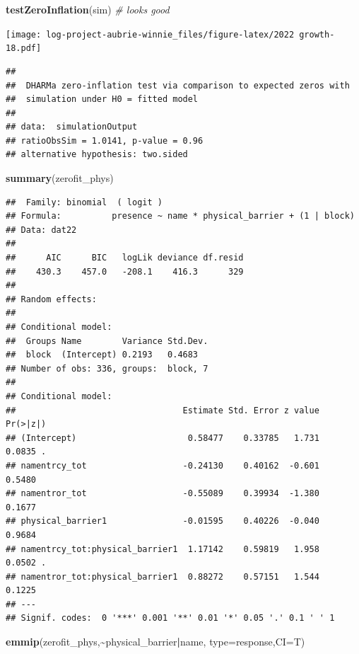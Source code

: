 \documentclass[
]{article}
\newenvironment{Shaded}{\begin{snugshade}}{\end{snugshade}}
\newcommand{\AttributeTok}[1]{\textcolor[rgb]{0.13,0.29,0.53}{#1}}
\newcommand{\CommentTok}[1]{\textcolor[rgb]{0.56,0.35,0.01}{\textit{#1}}}
\newcommand{\FunctionTok}[1]{\textcolor[rgb]{0.13,0.29,0.53}{\textbf{#1}}}
\newcommand{\NormalTok}[1]{#1}
\newcommand{\SpecialCharTok}[1]{\textcolor[rgb]{0.81,0.36,0.00}{\textbf{#1}}}
\newcommand{\StringTok}[1]{\textcolor[rgb]{0.31,0.60,0.02}{#1}}
\begin{document}
\begin{Shaded}
\begin{Highlighting}[]
\FunctionTok{testZeroInflation}\NormalTok{(sim) }\CommentTok{\# looks good}
\end{Highlighting}
\end{Shaded}

\texttt{[image: log-project-aubrie-winnie\_files/figure-latex/2022 growth-18.pdf]}

\begin{verbatim}
## 
##  DHARMa zero-inflation test via comparison to expected zeros with
##  simulation under H0 = fitted model
## 
## data:  simulationOutput
## ratioObsSim = 1.0141, p-value = 0.96
## alternative hypothesis: two.sided
\end{verbatim}

\begin{Shaded}
\begin{Highlighting}[]
\FunctionTok{summary}\NormalTok{(zerofit\_phys)}
\end{Highlighting}
\end{Shaded}

\begin{verbatim}
##  Family: binomial  ( logit )
## Formula:          presence ~ name * physical_barrier + (1 | block)
## Data: dat22
## 
##      AIC      BIC   logLik deviance df.resid 
##    430.3    457.0   -208.1    416.3      329 
## 
## Random effects:
## 
## Conditional model:
##  Groups Name        Variance Std.Dev.
##  block  (Intercept) 0.2193   0.4683  
## Number of obs: 336, groups:  block, 7
## 
## Conditional model:
##                                 Estimate Std. Error z value Pr(>|z|)  
## (Intercept)                      0.58477    0.33785   1.731   0.0835 .
## namentrcy_tot                   -0.24130    0.40162  -0.601   0.5480  
## namentror_tot                   -0.55089    0.39934  -1.380   0.1677  
## physical_barrier1               -0.01595    0.40226  -0.040   0.9684  
## namentrcy_tot:physical_barrier1  1.17142    0.59819   1.958   0.0502 .
## namentror_tot:physical_barrier1  0.88272    0.57151   1.544   0.1225  
## ---
## Signif. codes:  0 '***' 0.001 '**' 0.01 '*' 0.05 '.' 0.1 ' ' 1
\end{verbatim}

\begin{Shaded}
\begin{Highlighting}[]
\FunctionTok{emmip}\NormalTok{(zerofit\_phys,}\SpecialCharTok{\textasciitilde{}}\NormalTok{physical\_barrier}\SpecialCharTok{|}\NormalTok{name, }\AttributeTok{type=}\StringTok{\textquotesingle{}response\textquotesingle{}}\NormalTok{,}\AttributeTok{CI=}\NormalTok{T)}
\end{Highlighting}
\end{Shaded}
\end{document}

